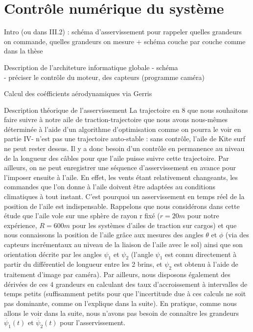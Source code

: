\documentclass[a4paper,12pt]{article}
\newcounter{partie}
\newcounter{sous-partie}
\newenvironment{partie}[1]
{
\section{#1}
}
{

}
\newenvironment{sous-partie}[1]
{
\subsection{#1}
}
{

}
\begin{document}
\begin{partie}{Contrôle numérique du système}
Intro (ou dans III.2) : schéma d'asservissement pour rappeler quelles grandeurs on commande, quelles grandeurs on mesure + schéma couche par  couche comme dans la thèse

\begin{sous-partie}{Description de l'architeture informatique globale}
- schéma
\\
- préciser le contrôle du moteur, des capteurs (programme caméra)
\end{sous-partie}
\begin{sous-partie}{Calcul des coéfficients aérodynamiques via Gerris}

\end{sous-partie}

\begin{sous-partie}{Description théorique de l'asservissement}
La trajectoire en 8 que nous souhaitons faire suivre à notre aile de traction-trajectoire que nous avons nous-mêmes déterminée à l'aide d'un algorithme d'optimisation comme on pourra le voir en partie IV- n'est pas une trajectoire auto-stable : sans contrôle, l'aile de Kite surf ne peut rester dessus. Il y a donc besoin d'un contrôle en permanence au niveau de la longueur des câbles pour que l'aile puisse suivre cette trajectoire. 
\newline
Par ailleurs, on ne peut enregistrer une séquence d'asservissement en avance pour l'imposer ensuite à l'aile. En effet, les vents étant relativement changeants, les commandes que l'on donne à l'aile doivent être adaptées au conditions climatiques à tout instant.
\newline
C'est pourquoi un asservissement en temps réel de la position de l'aile est indispensable.
Rappelons que nous considérons dans cette étude que l'aile vole sur une sphère de rayon r fixé ($r=20m$ pour notre expérience, $R=600 m$ pour les systèmes d'ailes de traction sur cargos) et que nous connaissons la position de l'aile grâce aux mesures des angles $\theta$ et $\phi$ (via des capteurs incrémentaux au niveau de la liaison de l'aile avec le sol) ainsi que son orientation décrite par les angles $\psi_1$ et $\psi_2$ (l'angle  $\psi_1$ est connu directement à partir du différentiel de longueur entre les 2 brins, et $\psi_2$ est obtenu à l'aide de traitement d'image par caméra).
Par ailleurs, nous disposons également des dérivées de ces 4 grandeurs en calculant des taux d'accroissement à intervalles de temps petits (suffisamment petits pour que l'incertitude due à ces calculs ne soit pas dominante, comme on l'explique dans la suite). En pratique, comme nous allons le voir dans la suite, nous n'avons pas besoin de connaître les grandeurs $\dot{\psi_1}(t)$ et $\dot{\psi_2}(t)$ pour l'asservissement.

\end{sous-partie}
\end{partie}
\end{document}
